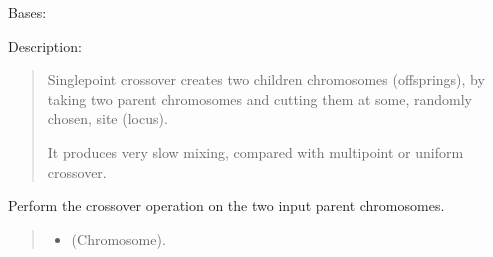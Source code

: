 \documentclass[letterpaper,10pt,english]{sphinxmanual}
\begin{document}
\begin{fulllineitems}
\label{\detokenize{pygenalgo.operators.crossover:pygenalgo.operators.crossover.single_point_crossover.SinglePointCrossover}}
\pysigstartsignatures
\pysiglinewithargsret
{}
{}
{}
\pysigstopsignatures
\sphinxAtStartPar
Bases: {\hyperref[\detokenize{pygenalgo.operators.crossover:pygenalgo.operators.crossover.crossover_operator.CrossoverOperator}]{}}

\sphinxAtStartPar
Description:
\begin{quote}

\sphinxAtStartPar
Single\sphinxhyphen{}point crossover creates two children chromosomes (offsprings),
by taking two parent chromosomes and cutting them at some, randomly
chosen, site (locus).

\sphinxAtStartPar
It produces very slow mixing, compared with multipoint or uniform crossover.
\end{quote}

\begin{fulllineitems}
\label{\detokenize{pygenalgo.operators.crossover:pygenalgo.operators.crossover.single_point_crossover.SinglePointCrossover.crossover}}
\pysigstartsignatures
\pysiglinewithargsret
{}
{\sphinxparamcomma {}}
{}
\pysigstopsignatures
\sphinxAtStartPar
Perform the crossover operation on the two input parent chromosomes.
\begin{quote}\begin{description}
\begin{itemize}
\item {} 
\sphinxAtStartPar
{} \textendash{} (Chromosome).


\end{itemize}
\end{description}
\end{quote}
\end{fulllineitems}
\end{fulllineitems}
\end{document}

